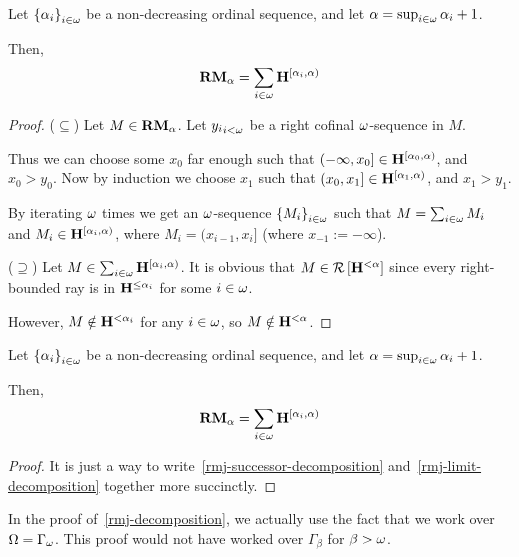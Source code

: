 \begin{lemma}\label{rmj-limit-decomposition}
  Let $\left\{ {\alpha_i} \right\}_{i \in \omega}$ be a non-decreasing ordinal sequence, and let $\alpha = \sup_{i \in \omega} {\alpha_i + 1}$.

  Then,
  \[
    \mathbf{RM}_{\alpha} = \sum_{i \in \omega}{\mathbf{H}_{}^{[\alpha_i, \alpha)}}
  \]
\end{lemma}

\begin{proof}
  ($\subseteq$) Let $M \in \mathbf{RM}_{\alpha}$.
  Let ${y_i}_{i < \omega}$ be a right cofinal $\omega$-sequence in $M$.

  Thus we can choose some $x_0$ far enough such that $(-\infty, x_0] \in \mathbf{H}_{}^{[\alpha_0, \alpha)}$,
          and $x_0 > y_0$.
          Now by induction we choose $x_1$ such that $(x_0, x_1] \in \mathbf{H}_{}^{[\alpha_1, \alpha)}$,
  and $x_1 > y_1$.

  By iterating $\omega$ times we get an $\omega$-sequence $\left\{ {M_i} \right\}_{i \in \omega}$
  such that $M = \sum_{i \in \omega} M_i$ and $M_i \in \mathbf{H}_{}^{[\alpha_i, \alpha)}$,
          where $M_i = (x_{i-1}, x_i]$ (where $x_{-1} := -\infty$).


  ($\supseteq$) Let $M \in \sum_{i \in \omega}{\mathbf{H}_{}^{[\alpha_i, \alpha)}}$.
  It is obvious that $M \in \mathcal{R} \left[ {\mathbf{H}_{}^{< \alpha}} \right]$ since every right-bounded
  ray is in $\mathbf{H}_{}^{\le \alpha_i}$ for some $i \in \omega$.

  However, $M \notin \mathbf{H}_{}^{< \alpha_i}$ for any $i \in \omega$, so $M \notin \mathbf{H}_{}^{< \alpha}$.


\end{proof}

\begin{lemma}\label{rmj-decomposition}
  Let $\left\{ {\alpha_i} \right\}_{i \in \omega}$ be a non-decreasing ordinal sequence,
  and let $\alpha = \sup_{i \in \omega} {\alpha_i + 1}$.

  Then,
  \[
    \mathbf{RM}_{\alpha} = \sum_{i \in \omega}{\mathbf{H}_{}^{[\alpha_i, \alpha)}}
  \]
\end{lemma}

\begin{proof}
  It is just a way to
  write~\cref{rmj-successor-decomposition}
  and~\cref{rmj-limit-decomposition}
  together more succinctly.
\end{proof}

\begin{note}
  In the proof of~\cref{rmj-decomposition}, we actually use the fact that
  we work over $\Omega = \Gamma_{\omega}$. This proof would not have worked over $\Gamma_{\beta}$
  for $\beta > \omega$.
\end{note}
